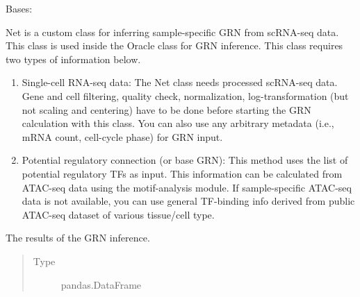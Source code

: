 \documentclass[letterpaper,10pt,english]{sphinxmanual}
\begin{document}

\begin{fulllineitems}
\label{\detokenize{modules/celloracle:celloracle.Net}}
Bases: 

Net is a custom class for inferring sample-specific GRN from scRNA-seq data.
This class is used inside the Oracle class for GRN inference.
This class requires two types of information below.
\begin{enumerate}
\def\theenumi{\arabic{enumi}}
\def\labelenumi{(\theenumi )}
\makeatletter\def\p@enumii{\p@enumi (\theenumi )}\makeatother
\item {} 
Single-cell RNA-seq data:
The Net class needs processed scRNA-seq data.
Gene and cell filtering, quality check, normalization, log-transformation (but not scaling and centering) have to be done before starting the GRN calculation with this class.
You can also use any arbitrary metadata (i.e., mRNA count, cell-cycle phase) for GRN input.

\item {} 
Potential regulatory connection (or base GRN):
This method uses the list of potential regulatory TFs as input.
This information can be calculated from ATAC-seq data using the motif-analysis module.
If sample-specific ATAC-seq data is not available,
you can use general TF-binding info derived from public ATAC-seq dataset of various tissue/cell type.

\end{enumerate}

\begin{fulllineitems}
\label{\detokenize{modules/celloracle:celloracle.Net.linkList}}
The results of the GRN inference.
\begin{quote}\begin{description}
\item[{Type}] \leavevmode
pandas.DataFrame

\end{description}\end{quote}


\end{fulllineitems}
\end{fulllineitems}
\end{document}
